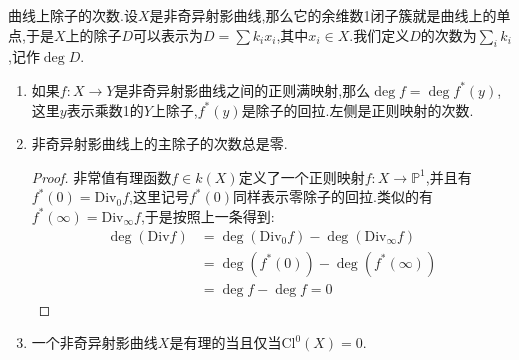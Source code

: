 曲线上除子的次数.设$X$是非奇异射影曲线,那么它的余维数1闭子簇就是曲线上的单点,于是$X$上的除子$D$可以表示为$D=\sum k_ix_i$,其中$x_i\in X$.我们定义$D$的次数为$\sum_ik_i$,记作$\deg D$.
\begin{enumerate}
	\item 如果$f:X\to Y$是非奇异射影曲线之间的正则满映射,那么$\deg f=\deg f^*(y)$,这里$y$表示乘数1的$Y$上除子,$f^*(y)$是除子的回拉.左侧是正则映射的次数.
	\item 非奇异射影曲线上的主除子的次数总是零.
	\begin{proof}
		
		非常值有理函数$f\in k(X)$定义了一个正则映射$f:X\to\mathbb{P}^1$,并且有$f^*(0)=\mathrm{Div}_0f$,这里记号$f^*(0)$同样表示零除子的回拉.类似的有$f^*(\infty)=\mathrm{Div}_{\infty}f$,于是按照上一条得到:
		\begin{align*}
		\deg(\mathrm{Div}f)&=\deg(\mathrm{Div}_0f)-\deg(\mathrm{Div}_{\infty}f)\\&=\deg(f^*(0))-\deg(f^*(\infty))\\&=\deg f-\deg f=0
		\end{align*}
	\end{proof}
    \item 一个非奇异射影曲线$X$是有理的当且仅当$\mathrm{Cl}^0(X)=0$.
\end{enumerate}

